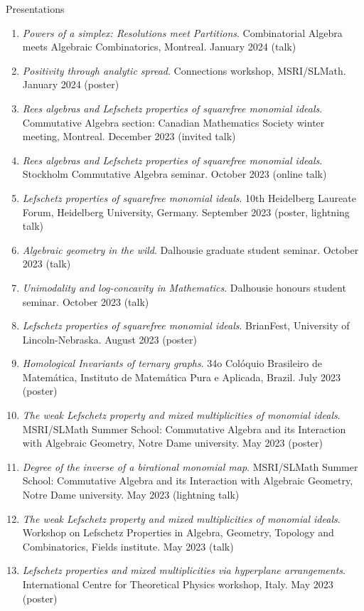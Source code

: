 \documentclass[12pt]{resume} %
\begin{document}
\begin{rSection}{Presentations}
\begin{enumerate}
        \item \textit{Powers of a simplex: Resolutions meet Partitions}. Combinatorial Algebra meets Algebraic Combinatorics, Montreal. January 2024 (talk)
        \item \textit{Positivity through analytic spread}. Connections workshop, MSRI/SLMath. January 2024 (poster)
        \item \textit{Rees algebras and Lefschetz properties of squarefree monomial ideals}. Commutative Algebra section: Canadian Mathematics Society winter meeting, Montreal. December 2023 (invited talk)
        \item \textit{Rees algebras and Lefschetz properties of squarefree monomial ideals}. Stockholm Commutative Algebra seminar. October 2023 (online talk)
        \item \textit{Lefschetz properties of squarefree monomial ideals}. 10th Heidelberg Laureate Forum, Heidelberg University, Germany. September 2023 (poster, lightning talk)
        \item \textit{Algebraic geometry in the wild}. Dalhousie graduate student seminar. October 2023 (talk)
        \item \textit{Unimodality and log-concavity in Mathematics}. Dalhousie honours student seminar. October 2023 (talk)
        \item \textit{Lefschetz properties of squarefree monomial ideals}. BrianFest, University of Lincoln-Nebraska. August 2023 (poster)
        \item \textit{Homological Invariants of ternary graphs}. 34o Colóquio Brasileiro de Matemática, Instituto de Matemática Pura e Aplicada, Brazil. July 2023 (poster)
        \item \textit{The weak Lefschetz property and mixed multiplicities of monomial ideals}. MSRI/SLMath Summer School: Commutative Algebra and its Interaction with Algebraic Geometry, Notre Dame university. May 2023 (poster)
        \item \textit{Degree of the inverse of a birational monomial map}. MSRI/SLMath Summer School: Commutative Algebra and its Interaction with Algebraic Geometry, Notre Dame university. May 2023 (lightning talk)
        \item \textit{The weak Lefschetz property and mixed multiplicities of monomial ideals}. Workshop on Lefschetz Properties in Algebra, Geometry, Topology and Combinatorics, Fields institute. May 2023 (talk)
        \item \textit{Lefschetz properties and mixed multiplicities via hyperplane arrangements}. International Centre for Theoretical Physics workshop, Italy. May 2023 (poster)

\end{enumerate}
\end{rSection}
\end{document}
